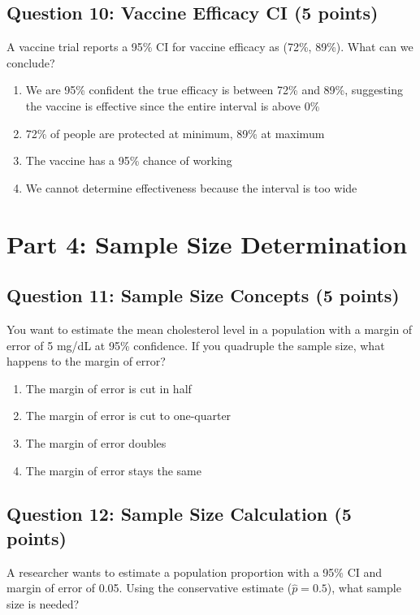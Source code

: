 \documentclass[11pt]{article}
\begin{document}
\subsection*{Question 10: Vaccine Efficacy CI (5 points)}

A vaccine trial reports a 95\% CI for vaccine efficacy as (72\%, 89\%). What can we conclude?

\begin{enumerate}[label=\alph*)]
\item We are 95\% confident the true efficacy is between 72\% and 89\%, suggesting the vaccine is effective since the entire interval is above 0\%
\item 72\% of people are protected at minimum, 89\% at maximum
\item The vaccine has a 95\% chance of working
\item We cannot determine effectiveness because the interval is too wide
\end{enumerate}

\section*{Part 4: Sample Size Determination}

\subsection*{Question 11: Sample Size Concepts (5 points)}

You want to estimate the mean cholesterol level in a population with a margin of error of 5 mg/dL at 95\% confidence. If you quadruple the sample size, what happens to the margin of error?

\begin{enumerate}[label=\alph*)]
\item The margin of error is cut in half
\item The margin of error is cut to one-quarter
\item The margin of error doubles
\item The margin of error stays the same
\end{enumerate}

\subsection*{Question 12: Sample Size Calculation (5 points)}

A researcher wants to estimate a population proportion with a 95\% CI and margin of error of 0.05. Using the conservative estimate ($\hat{p} = 0.5$), what sample size is needed?
\end{document}
